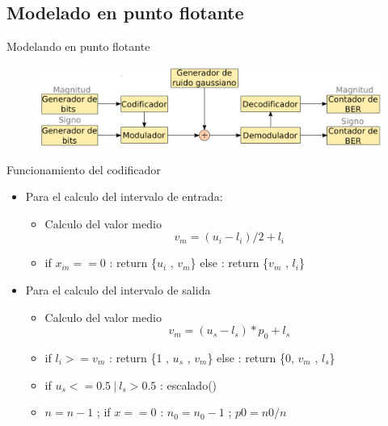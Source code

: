 \documentclass[xcolor=table]{beamer}
\begin{document}
\subsection{Modelado en punto flotante}

\begin{frame}{Modelando en punto flotante}
\begin{figure}[H]
  \centering
  \includegraphics[width=0.85\paperwidth]{Diagramas/proyect_alto_nivel.png}%
\end{figure}
\end{frame}

\begin{frame}{Funcionamiento del codificador}
    \begin{itemize}
        \item Para el calculo del intervalo de entrada:
        
        \begin{itemize}
            \item Calculo del valor medio 
                \begin{equation*}
                    v_{m} = (u_{i} - l_{i}) / 2 + l_{i} 
                \end{equation*}
            \item if $x_{in} == 0$ : return \{$u_{i}$ , $v_{m}$\} \tap  else : return \{$v_{m}$ , $l_{i}$\}
        \end{itemize}
        
        \item Para el calculo del intervalo de salida 
        
        \begin{itemize}
            \item Calculo del valor medio 
                \begin{equation*}
                    v_{m} = (u_{s} - l_{s}) * p_{0} + l_{s} 
                \end{equation*}
            \item if $l_{i} >= v_{m}$ : return \{1 , $u_{s}$ , $v_{m}$\} \tap  else : return \{0, $v_{m}$ , $l_{s}$\}
            \item if $u_{s} <= 0.5\ | \ l_{s} > 0.5$ : escalado()
            \item $n = n-1$ ; if $x == 0$ : $n_{0} = n_{0} - 1$ ; $p{0} = n{0} / n$
        \end{itemize}
    
    \end{itemize}
\end{frame}
\end{document}
